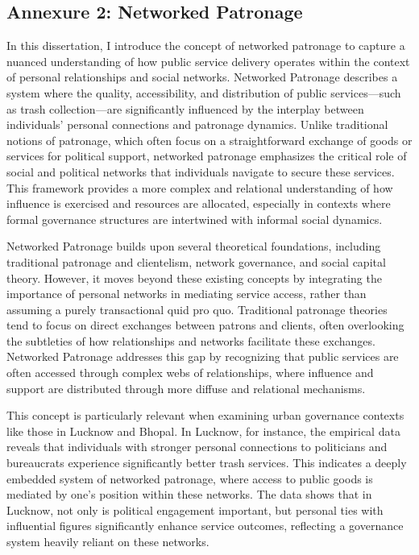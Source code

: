 \subsection{Annexure 2: Networked Patronage }

In this dissertation, I introduce the concept of networked patronage to capture a nuanced understanding of how public service delivery operates within the context of personal relationships and social networks. Networked Patronage describes a system where the quality, accessibility, and distribution of public services—such as trash collection—are significantly influenced by the interplay between individuals' personal connections and patronage dynamics. Unlike traditional notions of patronage, which often focus on a straightforward exchange of goods or services for political support, networked patronage emphasizes the critical role of social and political networks that individuals navigate to secure these services. This framework provides a more complex and relational understanding of how influence is exercised and resources are allocated, especially in contexts where formal governance structures are intertwined with informal social dynamics.

Networked Patronage builds upon several theoretical foundations, including traditional patronage and clientelism, network governance, and social capital theory. However, it moves beyond these existing concepts by integrating the importance of personal networks in mediating service access, rather than assuming a purely transactional quid pro quo. Traditional patronage theories tend to focus on direct exchanges between patrons and clients, often overlooking the subtleties of how relationships and networks facilitate these exchanges. Networked Patronage addresses this gap by recognizing that public services are often accessed through complex webs of relationships, where influence and support are distributed through more diffuse and relational mechanisms.

This concept is particularly relevant when examining urban governance contexts like those in Lucknow and Bhopal. In Lucknow, for instance, the empirical data reveals that individuals with stronger personal connections to politicians and bureaucrats experience significantly better trash services. This indicates a deeply embedded system of networked patronage, where access to public goods is mediated by one’s position within these networks. The data shows that in Lucknow, not only is political engagement important, but personal ties with influential figures significantly enhance service outcomes, reflecting a governance system heavily reliant on these networks.

